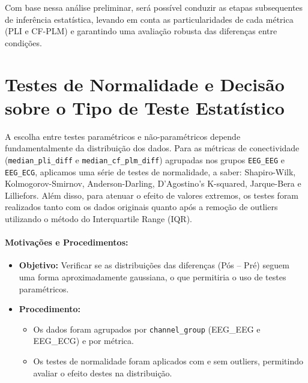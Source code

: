Com base nessa análise preliminar, será possível conduzir as etapas subsequentes de inferência estatística, levando em conta as particularidades de cada métrica (PLI e CF-PLM) e garantindo uma avaliação robusta das diferenças entre condições.

\section{Testes de Normalidade e Decisão sobre o Tipo de Teste Estatístico}
A escolha entre testes paramétricos e não-paramétricos depende fundamentalmente da distribuição dos dados. Para as métricas de conectividade (\texttt{median\_pli\_diff} e \texttt{median\_cf\_plm\_diff}) agrupadas nos grupos \texttt{EEG\_EEG} e \texttt{EEG\_ECG}, aplicamos uma série de testes de normalidade, a saber: Shapiro-Wilk, Kolmogorov-Smirnov, Anderson-Darling, D'Agostino's K-squared, Jarque-Bera e Lilliefors. Além disso, para atenuar o efeito de valores extremos, os testes foram realizados tanto com os dados originais quanto após a remoção de outliers utilizando o método do Interquartile Range (IQR).

\paragraph{Motivações e Procedimentos:}
\begin{itemize}
    \item \textbf{Objetivo:} Verificar se as distribuições das diferenças (Pós -- Pré) seguem uma forma aproximadamente gaussiana, o que permitiria o uso de testes paramétricos.
    \item \textbf{Procedimento:} 
    \begin{itemize}
        \item Os dados foram agrupados por \texttt{channel\_group} (EEG\_EEG e EEG\_ECG) e por métrica.
        \item Os testes de normalidade foram aplicados com e sem outliers, permitindo avaliar o efeito destes na distribuição.
    \end{itemize}
\end{itemize}

